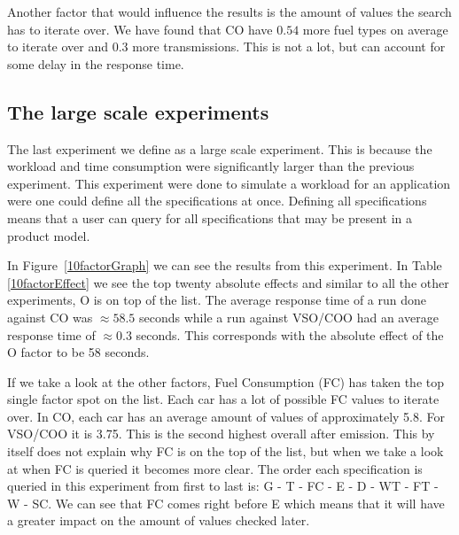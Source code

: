 \documentclass{llncs}
\begin{document}
Another factor that would influence the results is the amount of
values the search has to iterate over.  We have found that CO have
$0.54$ more fuel types on average to iterate over and $0.3$ more
transmissions. This is not a lot, but can account for some delay in
the response time.

\subsection{The large scale experiments}
The last experiment we define as a large scale experiment. This is
because the workload and time consumption were significantly larger
than the previous experiment. This experiment were done
to simulate a workload for an application were one could define all
the specifications at once. Defining all specifications means that a
user can query for all specifications that may be present in a product
model.

In Figure~\ref{10factorGraph} we can see the results from this
experiment. In Table
\ref{10factorEffect} we see the top twenty absolute effects and
similar to all the other experiments, O is on top of the list. The
average response time of a run done against CO was $\approx58.5$
seconds while a run against VSO/COO had an average response time of
$\approx0.3$ seconds.  This corresponds with the absolute effect of
the O factor to be 58 seconds.
 
If we take a look at the other factors, Fuel Consumption (FC) has
taken the top single factor spot on the list.  Each car has a lot of 
possible FC values to iterate
over. In CO, each car has an average amount of values of approximately
5.8. For VSO/COO it is 3.75.  This is the second highest overall after
emission. This by itself does not explain why FC is on the top of the
list, but when we take a look at when FC is queried it becomes more
clear. The order each specification is queried in this experiment 
from first to last is: G - T - FC - E - D - WT - FT - W - SC.  We can
see that FC comes right before E which means that it will have a
greater impact on the amount of values checked later. 
\end{document}

